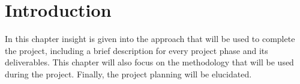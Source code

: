 \section{Introduction}
In this chapter insight is given into the approach that will be used to complete the project, including a brief description for every project phase and its deliverables. This chapter will also focus on the methodology that will be used during the project. Finally, the project planning will be elucidated.

